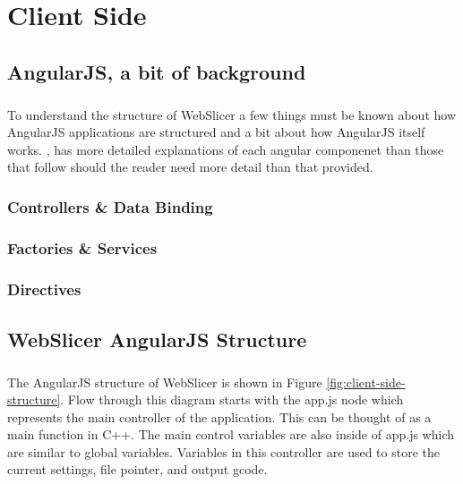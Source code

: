 \chapter{Client Side}

\section{AngularJS, a bit of background}
\paragraph{}
To understand the structure of WebSlicer a few things must be known about how AngularJS applications are structured and a bit about how AngularJS itself works.
\cite{meding-2016}, has more detailed explanations of each angular componenet than those that follow should the reader need more detail than that provided.
\subsection{Controllers \& Data Binding}
\paragraph{}

\subsection{Factories \& Services}
\paragraph{}
\subsection{Directives}
\paragraph{}

\section{WebSlicer AngularJS Structure}
\paragraph{}%
The AngularJS structure of WebSlicer is shown in Figure \ref{fig:client-side-structure}.
Flow through this diagram starts with the app.js node which represents the main controller of the application.
This can be thought of as a main function in C++.
The main control variables are also inside of app.js which are similar to global variables.
Variables in this controller are used to store the current settings, file pointer, and output gcode.

